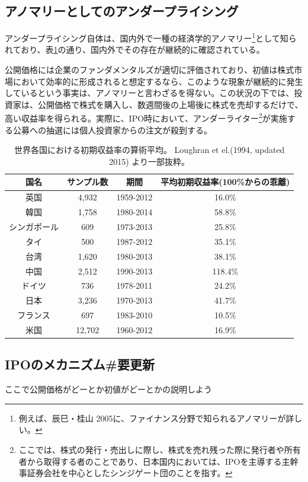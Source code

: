 \documentclass{jsarticle}
\begin{document}
\subsection{アノマリーとしてのアンダープライシング}
アンダープライシング自体は、国内外で一種の経済学的アノマリー\footnote[3]{例えば、辰巳・桂山 2005\cite{tatsumi}に、ファイナンス分野で知られるアノマリーが詳しい。}として知られており、表\ref{around_world}の通り、国内外でその存在が継続的に確認されている。 \par
公開価格には企業のファンダメンタルズが適切に評価されており、初値は株式市場において効率的に形成されると想定するなら、このような現象が継続的に発生しているという事実は、アノマリーと言わざるを得ない。この状況の下では、投資家は、公開価格で株式を購入し、数週間後の上場後に株式を売却するだけで、高い収益率を得られる。実際に、IPO時において、アンダーライター\footnote[4]{ここでは、株式の発行・売出しに際し、株式を売れ残った際に発行者や所有者から取得する者のことであり、日本国内においては、IPOを主導する主幹事証券会社を中心としたシンジゲート団のことを指す。}が実施する公募への抽選には個人投資家からの注文が殺到する。

\begin{table}[h]
	\caption{世界各国における初期収益率の算術平均。
	Loughran et el.(1994, updated 2015) \cite{Loughran}より一部抜粋。}
	\label{around_world}
	\centering
	\begin{tabular}{cccc}
		\hline
		国名&サンプル数&期間&平均初期収益率(100\%からの乖離) \\
		\hline \hline
		英国&4,932&1959-2012&16.0\% \\
		韓国&1,758&1980-2014& 58.8\% \\
		シンガポール&609&1973-2013&25.8\% \\
		タイ&500&1987-2012&35.1\%\\
		台湾 &1,620 &1980-2013&38.1\% \\
		中国&2,512&1990-2013&118.4\%\\
		ドイツ&736&1978-2011&24.2\% \\
		日本&3,236&1970-2013&41.7\% \\
		フランス & 697 & 1983-2010 & 10.5\% \\
		米国&12,702&1960-2012&16.9\%\\
		\hline
	\end{tabular}
\end{table}
\subsection{IPOのメカニズム\#要更新}
ここで公開価格がどーとか初値がどーとかの説明しよう
\end{document}
